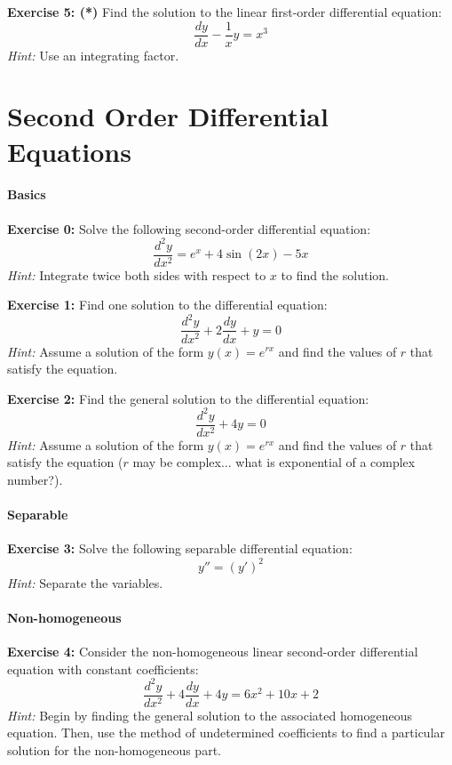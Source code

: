 \documentclass[]{article}
\begin{document}
	\textbf{Exercise 5: (*)}
	Find the solution to the linear first-order differential equation:
	\[
	\frac{dy}{dx} - \frac{1}{x}y = x^3
	\]
	\textit{Hint:} Use an integrating factor.
	
	
	
	\section{Second Order Differential Equations}
	\paragraph{Basics}\mbox{}
	
	\textbf{Exercise 0:}
	Solve the following second-order differential equation:
	\[
	\frac{d^2y}{dx^2} = e^x + 4\sin(2x) - 5x
	\]
	\textit{Hint:} Integrate twice both sides with respect to \(x\) to find the solution.
	
	\textbf{Exercise 1:}
	Find one solution to the differential equation:
	\[
	\frac{d^2y}{dx^2} + 2\frac{dy}{dx} + y = 0
	\]
	\textit{Hint:} Assume a solution of the form \(y(x) = e^{rx}\) and find the values of \(r\) that satisfy the equation.
	
	\textbf{Exercise 2:}
	Find the general solution to the differential equation:
	\[
	\frac{d^2y}{dx^2} + 4y = 0
	\]
	\textit{Hint:} Assume a solution of the form \(y(x) = e^{rx}\) and find the values of \(r\) that satisfy the equation ($r$ may be complex... what is exponential of a complex number?).
	
	\paragraph{Separable}\mbox{}
	
	\textbf{Exercise 3:}
	Solve the following separable differential equation:
	$$y'' = (y')^2$$
	\textit{Hint:} Separate the variables.
	
	\paragraph{Non-homogeneous}\mbox{}
	
	\textbf{Exercise 4:}
	Consider the non-homogeneous linear second-order differential equation with constant coefficients:
	\[
	\frac{d^2y}{dx^2} + 4\frac{dy}{dx} + 4y = 6x^2 + 10x + 2
	\]
	\textit{Hint:} Begin by finding the general solution to the associated homogeneous equation. Then, use the method of undetermined coefficients to find a particular solution for the non-homogeneous part.
	
\end{document}
